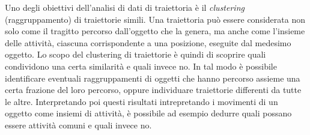 Uno degli obiettivi dell'analisi di dati di traiettoria è il \textit{clustering} (raggruppamento) di traiettorie simili.
Una traiettoria può essere considerata non solo come il tragitto percorso dall'oggetto che la genera,
ma anche come l'insieme delle attività, ciascuna corrispondente a una posizione, eseguite dal medesimo oggetto.
Lo scopo del clustering di traiettorie è quindi di scoprire quali condividono una certa similarità e quali invece no.
In tal modo è possibile identificare eventuali raggruppamenti di oggetti che hanno percorso assieme una certa frazione del loro percorso, oppure individuare
traiettorie differenti da tutte le altre.
Interpretando poi questi risultati intrepretando i movimenti di un oggetto come insiemi di attività,
 è possibile ad esempio dedurre quali possano essere attività comuni e quali invece no.
